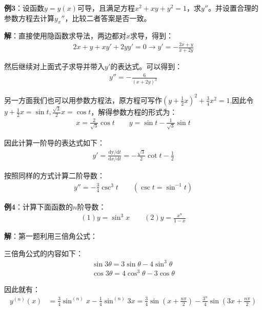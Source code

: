 \documentclass{ctexart}
\let\oldtextbf\textbf %
\renewcommand{\textbf}[1]{\textcolor{btex}{\oldtextbf{#1}}} %
\begin{document}
\textbf{例3}：设函数$y=y(x)$可导，且满足方程$x^2+xy+y^2=1$，求$y''$。并设置合理的参数方程去计算$y_x''$，比较二者答案是否一致。

\textbf{解}：直接使用隐函数求导法，两边都对$x$求导，得到：
\begin{align*}
    2x+y+xy'+2yy'=0\to y'=-\frac{2x+y}{x+2y}
\end{align*}

然后继续对上面式子求导并带入$y'$的表达式。可以得到：
\begin{align*}
    y''=-\frac{6}{(x+2y)^3}
\end{align*}

另一方面我们也可以用参数方程法，原方程可写作$(y+\frac{1}{2}x)^2+\frac{3}{4}x^2=1$,因此令$y+\frac{1}{2}x=\sin t,\frac{\sqrt{3}}{2}x=\cos t$，解得参数方程的形式为：
\begin{align*}
    x=\frac{2}{\sqrt{3}}\cos t\qquad y=\sin t-\frac{1}{\sqrt{3}}\sin t
\end{align*}

因此计算一阶导的表达式如下：
\begin{align*}
    y'=\frac{\mathrm{dy}/\mathrm{d}t}{\mathrm{d}x/\mathrm{d}t}=-\frac{\sqrt{3}}{2}\cot t-\frac{1}{2}
\end{align*}

按照同样的方式计算二阶导数：
\begin{align*}
    y''=-\frac{3}{4}\csc^3 t\qquad (\csc t=\sin^{-1}t)
\end{align*}

\textbf{例4}：计算下面函数的$n$阶导数：
\begin{align*}
    (1) y=\sin ^3 x \qquad (2) y=\frac{x^n}{1-x}
\end{align*}

\textbf{解}：第一题利用三倍角公式：
\begin{tcolorbox}[
    colback=bac1,     %
    colframe=fra1,   %
    coltitle=white,             %
    coltext=tex1,
    title=三倍角公式,
    fonttitle=\bfseries,        %
arc=3mm,                     %
breakable
]
三倍角公式的内容如下：
\begin{align*}
    \sin 3\theta=3\sin\theta-4\sin^3\theta\\
    \cos 3\theta=4\cos^3\theta-3\cos\theta\tag{2-12}
\end{align*}
\end{tcolorbox}

因此就有：
\begin{align*}
    y^{(n)}(x)&=\frac{3}{4}\sin^{(n)}x-\frac{1}{4}\sin^{(n)}3x=\frac{3}{4}\sin(x+\frac{n\pi}{2})-\frac{3^n}{4}\sin(3x+\frac{n\pi}{2})
\end{align*}
\end{document}
